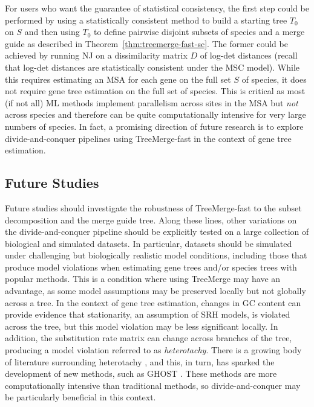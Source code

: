 For users who want the guarantee of statistical consistency, the first step could be performed by using a statistically consistent method to build a starting tree $T_0$ on $S$ and then using $T_0$ to define pairwise disjoint subsets of species and a merge guide as described in Theorem~\ref{thm:treemerge-fast-sc}.
The former could be achieved by running NJ on a dissimilarity matrix $D$ of log-det distances (recall that log-det distances are statistically consistent under the MSC model). 
While this requires estimating an MSA for each gene on the full set $S$ of species, it does not require gene tree estimation on the full set of species.
This is critical as most (if not all) ML methods implement parallelism across sites in the MSA but {\em not} across species and therefore can be quite computationally intensive for very large numbers of species.
In fact, a promising direction of future research is to explore divide-and-conquer pipelines using TreeMerge-fast in the context of gene tree estimation.

\subsection{Future Studies}
Future studies should investigate the robustness of TreeMerge-fast to the subset decomposition and the merge guide tree.
Along these lines, other variations on the divide-and-conquer pipeline should be explicitly tested on a large collection of biological and simulated datasets.
In particular, datasets should be simulated under challenging but biologically realistic model conditions, including those that produce model violations when estimating gene trees and/or species trees with popular methods.
This is a condition where using TreeMerge may have an advantage, as some model assumptions may be preserved locally but not globally across a tree.
In the context of gene tree estimation, changes in GC content can provide evidence that stationarity, an assumption of \gls{SRH} models, is violated across the tree, but this model violation may be less significant locally.
In addition, the substitution rate matrix can change across branches of the tree, producing a model violation referred to as \textit{\gls{heterotachy}}. 
There is a growing body of literature surrounding heterotachy \cite{lopez2002heterotachy, jermiin2004biasing, lockhart2005heterotachy, zhou2007evaluation}, and this, in turn, has sparked the development of new methods, such as GHOST \cite{crotty2019ghost}.
These methods are more computationally intensive than traditional methods, so divide-and-conquer may be particularly beneficial in this context.

